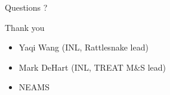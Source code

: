 \documentclass[8pt]{beamer}
\begin{document}
\begin{frame}{Questions ?}


\begin{block}{Thank you}
\begin{itemize}
\item Yaqi Wang (INL, Rattlesnake lead)
\item Mark DeHart (INL, TREAT M\&S lead)
\item NEAMS
\end{itemize}
\end{block}

\end{frame}


%
%
%

%
%

\end{document}
